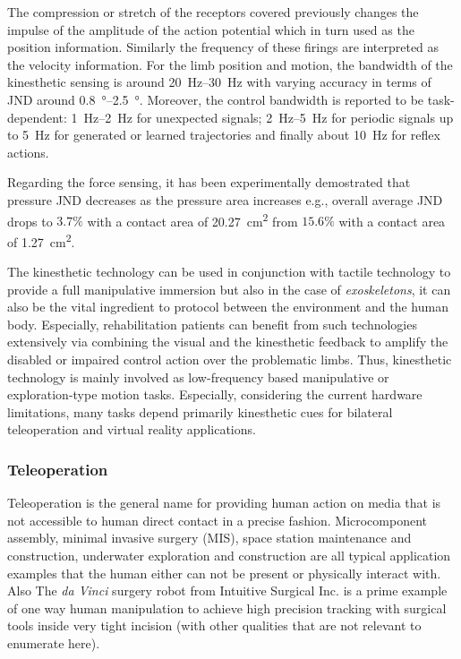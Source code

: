 The compression or stretch of the receptors covered previously changes the impulse of the amplitude of the action potential which in turn used as the position information. Similarly the frequency of these firings are interpreted as the velocity information. For the limb position and motion, the bandwidth of the kinesthetic sensing is around \SIrange{20}{30}{\hertz} with varying accuracy in terms of JND around \SIrange{0.8}{2.5}{\degree}. Moreover, the control bandwidth is reported to be task-dependent: \SIrange{1}{2}{\hertz} for unexpected signals; \SIrange{2}{5}{\hertz} for periodic signals up to \SI{5}{\hertz} for generated or learned trajectories and finally about \SI{10}{\hertz} for reflex actions. 

Regarding the force sensing, it has been experimentally demostrated that pressure JND decreases as the pressure area increases e.g., overall average JND drops to $3.7\%$ with a contact area of \SI{20.27}{\centi\meter\squared} from $15.6\%$ with a contact area of \SI{1.27}{\centi\meter\squared}. 

The kinesthetic technology can be used in conjunction with tactile technology to provide a full manipulative immersion but also in the case of \emph{exoskeletons}, it can also be the vital ingredient to protocol between the environment and the human body. Especially, rehabilitation patients can benefit from such technologies extensively via combining the visual and the kinesthetic feedback to amplify the disabled or impaired control action over the problematic limbs. Thus, kinesthetic technology is mainly involved as low-frequency based manipulative or exploration-type motion tasks. Especially, considering the current hardware limitations, many tasks depend primarily kinesthetic cues for bilateral teleoperation and virtual reality applications.


\subsubsection{Teleoperation}
Teleoperation is the general name for providing human action on media that is not accessible to human direct contact in a precise fashion. Microcomponent assembly, minimal invasive surgery (MIS), space station maintenance and construction, underwater exploration and construction are all typical application examples that the human either can not be present or physically interact with. Also The \emph{da Vinci}\raisebox{0.5ex}{\scriptsize\texttrademark} surgery robot from Intuitive Surgical Inc. is a prime example of one way human manipulation to achieve high precision tracking with surgical tools inside very tight incision (with other qualities that are not relevant to enumerate here). 

